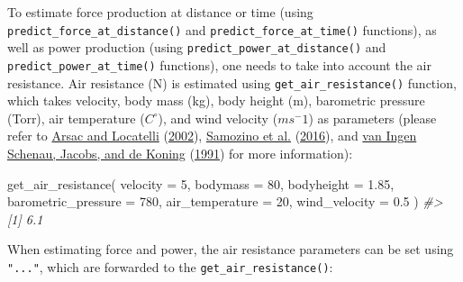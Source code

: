 \documentclass[fleqn,10pt,lineno]{wlpeerj} %
\newenvironment{Shaded}{\begin{snugshade}}{\end{snugshade}}
\newcommand{\AttributeTok}[1]{\textcolor[rgb]{0.77,0.63,0.00}{#1}}
\newcommand{\CommentTok}[1]{\textcolor[rgb]{0.56,0.35,0.01}{\textit{#1}}}
\newcommand{\DecValTok}[1]{\textcolor[rgb]{0.00,0.00,0.81}{#1}}
\newcommand{\FloatTok}[1]{\textcolor[rgb]{0.00,0.00,0.81}{#1}}
\newcommand{\FunctionTok}[1]{\textcolor[rgb]{0.00,0.00,0.00}{#1}}
\newcommand{\NormalTok}[1]{#1}
\newcommand{\SpecialCharTok}[1]{\textcolor[rgb]{0.00,0.00,0.00}{#1}}
\begin{document}
To estimate force production at distance or time (using \texttt{predict\_force\_at\_distance()} and \texttt{predict\_force\_at\_time()} functions), as well as power production (using \texttt{predict\_power\_at\_distance()} and \texttt{predict\_power\_at\_time()} functions), one needs to take into account the air resistance. Air resistance (N) is estimated using \texttt{get\_air\_resistance()} function, which takes velocity, body mass (kg), body height (m), barometric pressure (Torr), air temperature (\(C^\circ\)), and wind velocity (\(ms^-1\)) as parameters (please refer to \protect\hyperlink{ref-arsacModelingEnergetics100m2002}{Arsac and Locatelli} (\protect\hyperlink{ref-arsacModelingEnergetics100m2002}{2002}), \protect\hyperlink{ref-samozinoSimpleMethodMeasuring2016}{Samozino et al.} (\protect\hyperlink{ref-samozinoSimpleMethodMeasuring2016}{2016}), and \protect\hyperlink{ref-vaningenschenauCanCyclePower1991}{van Ingen Schenau, Jacobs, and de Koning} (\protect\hyperlink{ref-vaningenschenauCanCyclePower1991}{1991}) for more information):

\begin{Shaded}
\begin{Highlighting}[]
\FunctionTok{get\_air\_resistance}\NormalTok{(}
  \AttributeTok{velocity =} \DecValTok{5}\NormalTok{,}
  \AttributeTok{bodymass =} \DecValTok{80}\NormalTok{,}
  \AttributeTok{bodyheight =} \FloatTok{1.85}\NormalTok{,}
  \AttributeTok{barometric\_pressure =} \DecValTok{780}\NormalTok{,}
  \AttributeTok{air\_temperature =} \DecValTok{20}\NormalTok{,}
  \AttributeTok{wind\_velocity =} \FloatTok{0.5}
\NormalTok{)}
\CommentTok{\#\textgreater{} [1] 6.1}
\end{Highlighting}
\end{Shaded}

When estimating force and power, the air resistance parameters can be set using \texttt{"..."}, which are forwarded to the \texttt{get\_air\_resistance()}:

\begin{Shaded}
\end{Shaded}
\end{document}
